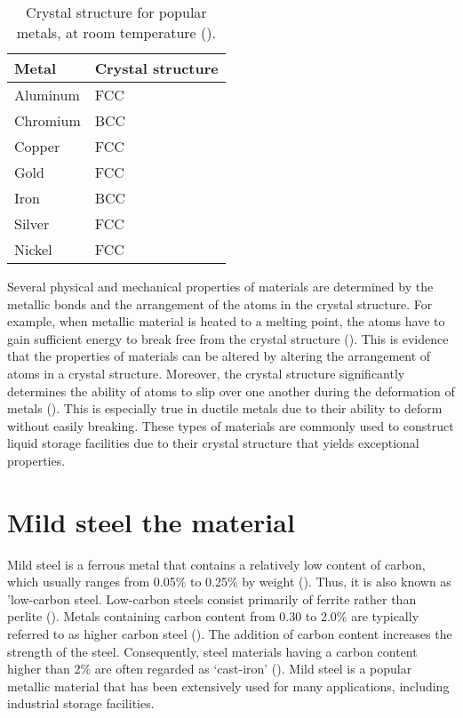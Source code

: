 \begin{table}[H]
\caption{Crystal structure for popular metals, at room temperature (\cite{hench2005biomaterials}).}

\begin{tabularx}{.8\textwidth}{ XX }
    \hline
    Metal & Crystal structure \\
    \hline
    Aluminum & FCC \\
    Chromium & BCC \\
    Copper & FCC \\
    Gold & FCC \\
    Iron & BCC \\
    Silver & FCC \\
    Nickel & FCC \\
    \hline
\end{tabularx}

\label{ch3:table:structure}
\end{table}

Several physical and mechanical properties of materials are determined by the metallic bonds and the arrangement of the atoms in the crystal structure. For example, when metallic material is heated to a melting point, the atoms have to gain sufficient energy to break free from the crystal structure (\cite{hench2005biomaterials}). This is evidence that the properties of materials can be altered by altering the arrangement of atoms in a crystal structure. Moreover, the crystal structure significantly determines the ability of atoms to slip over one another during the deformation of metals (\cite{callister2018materials}). This is especially true in ductile metals due to their ability to deform without easily breaking. These types of materials are commonly used to construct liquid storage facilities due to their crystal structure that yields exceptional properties.

\section{Mild steel the material}
\label{ch3:anchor:section:material}
Mild steel is a ferrous metal that contains a relatively low content of carbon, which usually ranges from 0.05\% to 0.25\% by weight (\cite{callister2018materials}). Thus, it is also known as 'low-carbon steel.  Low-carbon steels consist primarily of ferrite rather than perlite (\cite{li2018effect}). Metals containing carbon content from 0.30 to 2.0\% are typically referred to as higher carbon steel (\cite{timings2008fabrication}). The addition of carbon content increases the strength of the steel. Consequently, steel materials having a carbon content higher than 2\% are often regarded as ‘cast-iron' (\cite{callister2018materials}).  Mild steel is a popular metallic material that has been extensively used for many applications, including industrial storage facilities.

